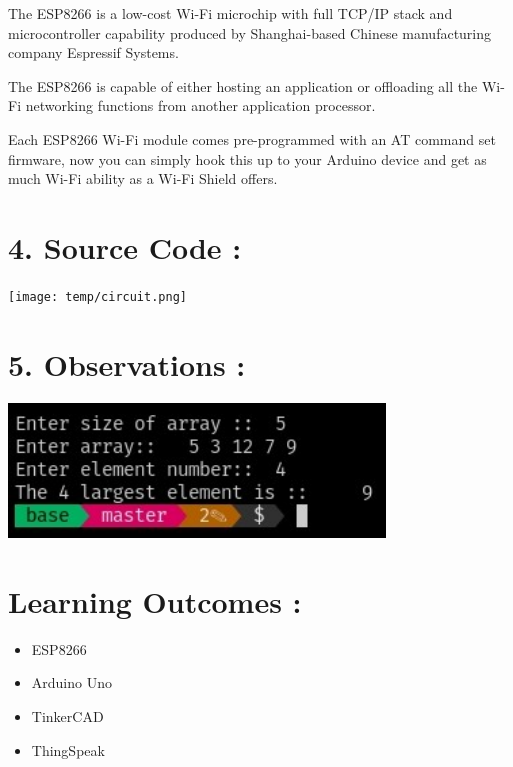 \documentclass[14pt]{extarticle}
\begin{document}
The ESP8266 is a low-cost Wi-Fi microchip with full TCP/IP stack and microcontroller capability produced by Shanghai-based Chinese manufacturing company Espressif Systems. 

The ESP8266 is capable of either hosting an application or offloading all the Wi-Fi networking functions from another application processor. 

Each ESP8266 Wi-Fi module comes pre-programmed with an AT command set firmware, now you can simply hook this up to your Arduino device and get as much Wi-Fi ability as a Wi-Fi Shield offers. 



\newpage
\section*{\normalsize 4. Source Code :}

\texttt{[image: temp/circuit.png]}
\newpage


\section*{\normalsize 5. Observations :}

\begin{center}
  \includegraphics[width=0.75\textwidth]{temp/output.jpeg}
\end{center}

\section*{\normalsize Learning Outcomes :}
  
  \begin{itemize}
    \item ESP8266
    \item Arduino Uno
    \item TinkerCAD
    \item ThingSpeak
  \end{itemize}
\end{document}
